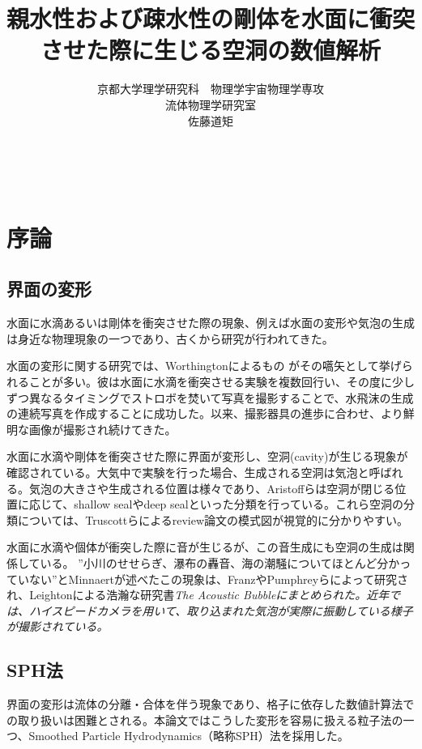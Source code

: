 \documentclass[]{jsarticle}
\begin{document}
\title{親水性および疎水性の剛体を水面に衝突させた際に生じる空洞の数値解析}
\author{京都大学理学研究科　物理学宇宙物理学専攻\\流体物理学研究室\\佐藤道矩}
\maketitle
\newpage
　
\newpage

\tableofcontents
\newpage
\section{序論}
\subsection{界面の変形}
水面に水滴あるいは剛体を衝突させた際の現象、例えば水面の変形や気泡の生成は身近な物理現象の一つであり、古くから研究が行われてきた。

水面の変形に関する研究では、Worthingtonによるもの \cite{Worthington1908}がその嚆矢として挙げられることが多い。彼は水面に水滴を衝突させる実験を複数回行い、その度に少しずつ異なるタイミングでストロボを焚いて写真を撮影することで、水飛沫の生成の連続写真を作成することに成功した。以来、撮影器具の進歩に合わせ、より鮮明な画像が撮影され続けてきた。

水面に水滴や剛体を衝突させた際に界面が変形し、空洞(cavity)が生じる現象が確認されている。大気中で実験を行った場合、生成される空洞は気泡と呼ばれる。気泡の大きさや生成される位置は様々であり、Aristoffらは空洞が閉じる位置に応じて、shallow sealやdeep sealといった分類を行っている\cite{Aristoff2009}。これら空洞の分類については、Truscottらによるreview論文\cite{Truscott2014}の模式図が視覚的に分かりやすい。

水面に水滴や個体が衝突した際に音が生じるが、この音生成にも空洞の生成は関係している。
”小川のせせらぎ、瀑布の轟音、海の潮騒についてほとんど分かっていない”とMinnaert\cite{minnaert1933xvi}が述べたこの現象は、Franz\cite{Franz1959}やPumphrey\cite{Pumphrey1990}らによって研究され、Leightonによる浩瀚な研究書\it{The Acoustic Bubble}\rm\cite{leightonacoustic}にまとめられた。近年では、ハイスピードカメラを用いて、取り込まれた気泡が実際に振動している様子が撮影されている\cite{Phillips2018}。

\subsection{SPH法}
界面の変形は流体の分離・合体を伴う現象であり、格子に依存した数値計算法での取り扱いは困難とされる。本論文ではこうした変形を容易に扱える粒子法の一つ、Smoothed Particle Hydrodynamics（略称SPH）法を採用した。
\end{document}
